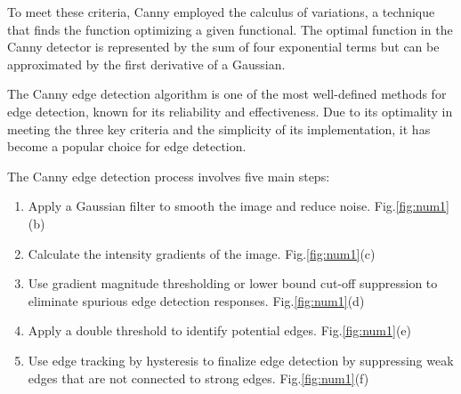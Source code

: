 To meet these criteria, Canny employed the calculus of variations, a technique that finds the function optimizing a given functional. The optimal function in the Canny detector is represented by the sum of four exponential terms but can be approximated by the first derivative of a Gaussian.

The Canny edge detection algorithm is one of the most well-defined methods for edge detection, known for its reliability and effectiveness. Due to its optimality in meeting the three key criteria and the simplicity of its implementation, it has become a popular choice for edge detection.

The Canny edge detection process involves five main steps:

\begin{enumerate}
        \item Apply a Gaussian filter to smooth the image and reduce noise. Fig.\ref{fig:num1}(b)
        \item Calculate the intensity gradients of the image. Fig.\ref{fig:num1}(c)
        \item Use gradient magnitude thresholding or lower bound cut-off suppression to eliminate spurious edge detection responses. Fig.\ref{fig:num1}(d)
        \item Apply a double threshold to identify potential edges. Fig.\ref{fig:num1}(e)
        \item Use edge tracking by hysteresis to finalize edge detection by suppressing weak edges that are not connected to strong edges. Fig.\ref{fig:num1}(f)
\end{enumerate}

